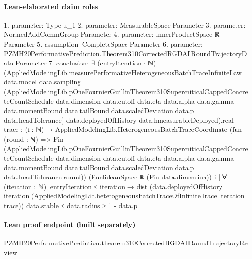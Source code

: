 \documentclass[10pt]{article}
\begin{document}
\paragraph{Lean-elaborated claim roles}\begin{ReviewVerbatim}
1. parameter: Type u_1
2. parameter: MeasurableSpace Parameter
3. parameter: NormedAddCommGroup Parameter
4. parameter: InnerProductSpace ℝ Parameter
5. assumption: CompleteSpace Parameter
6. parameter: PZMH20PerformativePrediction.Theorem310CorrectedRGDAllRoundTrajectoryData Parameter
7. conclusion: ∃ (entryIteration : ℕ),
  (AppliedModelingLib.measurePerformativeHeterogeneousBatchTraceInfiniteLaw data.model data.sampling
          (AppliedModelingLib.pOneFournierGuillinTheorem310SupercriticalCappedConcreteCountSchedule data.dimension
            data.cutoff data.eta data.alpha data.gamma data.momentBound data.tailBound data.scaledDeviation data.p
            data.headTolerance)
          data.deployedOfHistory data.hmeasurableDeployed).real
      {trace :
        (i : ℕ) →
          AppliedModelingLib.HeterogeneousBatchTraceCoordinate
            (fun (round : ℕ) =>
              Fin
                (AppliedModelingLib.pOneFournierGuillinTheorem310SupercriticalCappedConcreteCountSchedule data.dimension
                  data.cutoff data.eta data.alpha data.gamma data.momentBound data.tailBound data.scaledDeviation data.p
                  data.headTolerance round))
            (EuclideanSpace ℝ (Fin data.dimension)) i |
        ∀ (iteration : ℕ),
          entryIteration ≤ iteration →
            dist
                (data.deployedOfHistory iteration
                  (AppliedModelingLib.heterogeneousBatchTraceOfInfiniteTrace iteration trace))
                data.stable ≤
              data.radius} ≥
    1 - data.p
\end{ReviewVerbatim}

\paragraph{Lean proof endpoint (built separately)}\begin{ReviewVerbatim}
PZMH20PerformativePrediction.theorem310CorrectedRGDAllRoundTrajectoryReview
\end{ReviewVerbatim}
\end{document}

